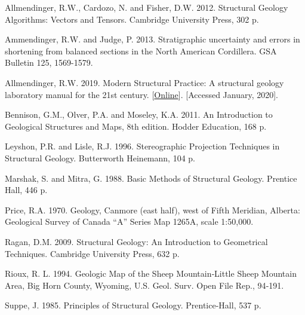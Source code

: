 \documentclass[a4paper , 12pt]{book}
\begin{document}
Allmendinger, R.W., Cardozo, N. and Fisher, D.W. 2012. Structural Geology Algorithms: Vectors and Tensors. Cambridge University Press, 302 p.

Ammendinger, R.W. and Judge, P. 2013. Stratigraphic uncertainty and errors in shortening from balanced sections in the North American Cordillera. GSA Bulletin 125, 1569-1579.

Allmendinger, R.W. 2019. Modern Structural Practice: A structural geology laboratory manual for the 21st century. [\href{http://www.geo.cornell.edu/geology/faculty/RWA/structure-lab-manual}{Online}]. [Accessed January, 2020].

Bennison, G.M., Olver, P.A. and Moseley, K.A. 2011. An Introduction to Geological Structures and Maps, 8th edition. Hodder Education, 168 p.

Leyshon, P.R. and Lisle, R.J. 1996. Stereographic Projection Techniques in Structural Geology. Butterworth Heinemann, 104 p.

Marshak, S. and Mitra, G. 1988. Basic Methods of Structural Geology. Prentice Hall, 446 p.

Price, R.A. 1970. Geology, Canmore (east half), west of Fifth Meridian, Alberta: Geological Survey of Canada “A” Series Map 1265A, scale 1:50,000.

Ragan, D.M. 2009. Structural Geology: An Introduction to Geometrical Techniques. Cambridge University Press, 632 p.

Rioux, R. L. 1994. Geologic Map of the Sheep Mountain‐Little Sheep Mountain Area, Big Horn County, Wyoming, U.S. Geol. Surv. Open File Rep., 94‐191.

Suppe, J. 1985. Principles of Structural Geology. Prentice-Hall, 537 p.
\end{document}
